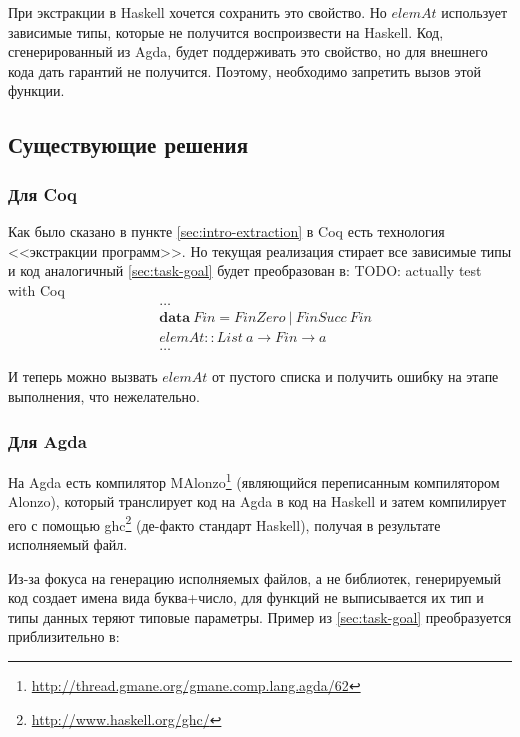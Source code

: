 При экстракции в Haskell хочется сохранить это свойство. Но \(elemAt\)
использует зависимые типы, которые не получится воспроизвести на Haskell.
Код, сгенерированный из Agda, будет поддерживать это свойство, но для
внешнего кода дать гарантий не получится. Поэтому, необходимо запретить
вызов этой функции.

\subsection{Существующие решения}

\subsubsection{Для Coq}

Как было сказано в пункте \ref{sec:intro-extraction} в Coq есть технология
<<экстракции программ>>. Но текущая реализация стирает все зависимые типы и
код аналогичный \ref{sec:task-goal} будет преобразован в: TODO: actually test with Coq
\begin{align*}
&\dots\\
&\mathbf{data}\ Fin = FinZero\ |\ FinSucc\ Fin\\
&elemAt :: List\ a \rightarrow Fin \rightarrow a\\
&\dots
\end{align*}

И теперь можно вызвать \(elemAt\) от пустого списка и получить ошибку на
этапе выполнения, что нежелательно.

\subsubsection{Для Agda}

На Agda есть компилятор
MAlonzo\footnote{\url{http://thread.gmane.org/gmane.comp.lang.agda/62}}
(являющийся переписанным компилятором Alonzo\cite{Ben07}), который транслирует
код на Agda в код на Haskell и затем компилирует его с помощью
ghc\footnote{\url{http://www.haskell.org/ghc/}} (де-факто стандарт Haskell),
получая в результате исполняемый файл.

Из-за фокуса на генерацию исполняемых файлов, а не библиотек,
генерируемый код создает имена вида буква+число, для функций
не выписывается их тип и типы данных теряют типовые параметры.
Пример из \ref{sec:task-goal} преобразуется приблизительно в:

